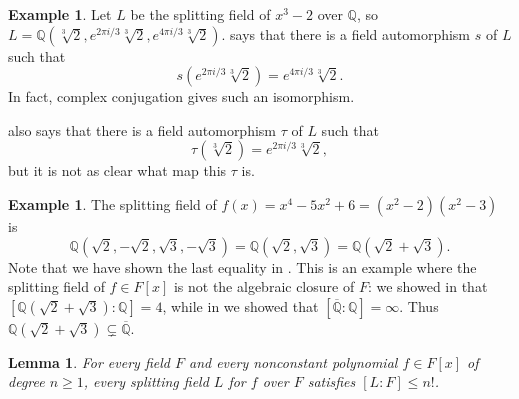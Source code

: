 \documentclass[12pt]{report}
\newtheorem{lemma}[theorem]{Lemma}
\numberwithin{equation}{section}
\numberwithin{theorem}{chapter}
\theoremstyle{definition}
\newtheorem{example}[theorem]{Example}
\newtheorem*{basic properties}{Basic Properties}
\newtheorem*{Important Remark}{Important Remark}
\begin{document}
\begin{example} 
Let $L$ be the splitting field of $x^3 - 2$ over $\mathbb{Q}$, so $L = \mathbb{Q}(\sqrt[3]{2}, e^{2 \pi i/3}\sqrt[3]{2}, e^{4 \pi i/3}\sqrt[3]{2})$.
 says that there is a field automorphism $s$ of $L$ such that 
$$s(e^{2 \pi i/3}\sqrt[3]{2}) = e^{4 \pi i/3}\sqrt[3]{2}.$$
In fact, complex conjugation gives such an isomorphism.

 also says that there is a field automorphism $\tau$ of $L$ such that 
$$\tau(\sqrt[3]{2}) = e^{2 \pi i/3}\sqrt[3]{2},$$ 
but it is not as clear what map this $\tau$ is.
\end{example}




\begin{example}
The splitting field of $f(x) = x^4 - 5x^2 + 6 = (x^2 - 2)(x^2 - 3)$ is $$\mathbb{Q}(\sqrt{2}, -\sqrt{2}, \sqrt{3}, -\sqrt{3}) = \mathbb{Q}(\sqrt{2}, \sqrt{3}) = \mathbb{Q}(\sqrt{2} + \sqrt{3}).$$
Note that we have shown the last equality in . This is an example where the splitting field of $f \in F[x]$ is not the algebraic closure of $F$: we showed in  that $[\mathbb{Q}(\sqrt{2} + \sqrt{3}) : \mathbb{Q}] = 4$, while in  we showed that $[\overline{\mathbb{Q}} : \mathbb{Q}] = \infty$. Thus $\mathbb{Q}(\sqrt{2} + \sqrt{3}) \subsetneq \overline{\mathbb{Q}}$.
\end{example}


\begin{lemma}\label{degree splitting field n!}
For every field $F$ and every nonconstant polynomial $f \in F[x]$ of degree $n \geqslant 1$, every splitting field $L$ for $f$ over $F$ satisfies $[L:F]\leqslant n!$.
\end{lemma}
\end{document}
